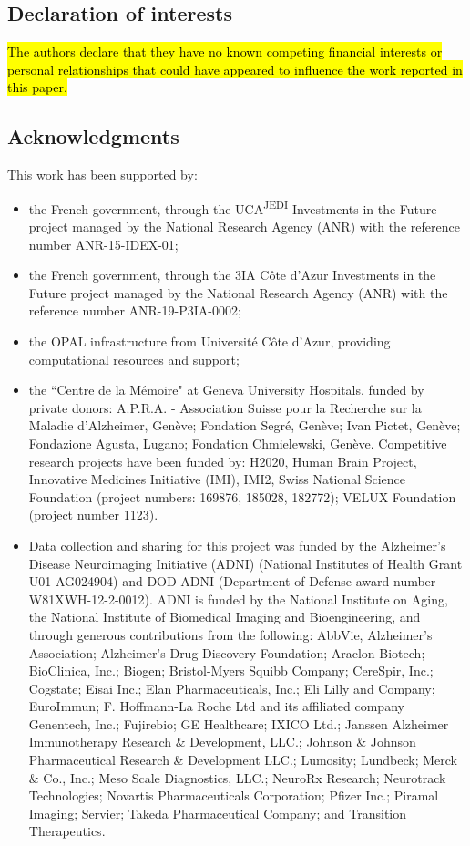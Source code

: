 \subsection*{Declaration of interests}
\hl{The authors declare that they have no known competing financial interests or personal relationships that could have appeared to influence the work reported in this paper.}
\subsection*{Acknowledgments}
\label{sec:ack}

This work has been supported by:
\begin{itemize}
%
\item the French government, through the UCA\textsuperscript{JEDI} Investments in the Future project managed by the National Research Agency (ANR) with the reference number ANR-15-IDEX-01;
%
\item the French government, through the 3IA Côte d'Azur Investments in the Future project managed by the National Research Agency (ANR) with the reference number ANR-19-P3IA-0002;
%
\item the OPAL infrastructure from Université Côte d'Azur, providing computational resources and support;
%
\item the ``Centre de la Mémoire" at Geneva University Hospitals, funded by private donors:
A.P.R.A. - Association Suisse pour la Recherche sur la Maladie d’Alzheimer, Genève;
Fondation Segré, Genève;
Ivan Pictet, Genève;
Fondazione Agusta, Lugano;
Fondation Chmielewski, Genève.
Competitive research projects have been funded by: H2020, Human Brain Project, Innovative Medicines Initiative (IMI), IMI2, Swiss National Science Foundation (project numbers: 169876, 185028, 182772);
VELUX Foundation (project number 1123).
%
\item Data collection and sharing for this project was funded by the Alzheimer's Disease Neuroimaging Initiative (ADNI) (National Institutes of Health Grant U01 AG024904) and DOD ADNI (Department of Defense award number W81XWH-12-2-0012).
ADNI is funded by the National Institute on Aging, the National Institute of Biomedical Imaging and Bioengineering, and through generous contributions from the following:
AbbVie, Alzheimer's Association; Alzheimer's Drug Discovery Foundation; Araclon Biotech; BioClinica, Inc.; Biogen; Bristol-Myers Squibb Company; CereSpir, Inc.; Cogstate; Eisai Inc.; Elan Pharmaceuticals, Inc.; Eli Lilly and Company; EuroImmun; F. Hoffmann-La Roche Ltd and its affiliated company Genentech, Inc.; Fujirebio; GE Healthcare; IXICO Ltd.; Janssen Alzheimer Immunotherapy Research \& Development, LLC.; Johnson \& Johnson Pharmaceutical Research \& Development LLC.; Lumosity; Lundbeck; Merck \& Co., Inc.; Meso Scale Diagnostics, LLC.; NeuroRx Research; Neurotrack Technologies; Novartis Pharmaceuticals Corporation; Pfizer Inc.; Piramal Imaging; Servier; Takeda Pharmaceutical Company; and Transition Therapeutics.

\end{itemize}
